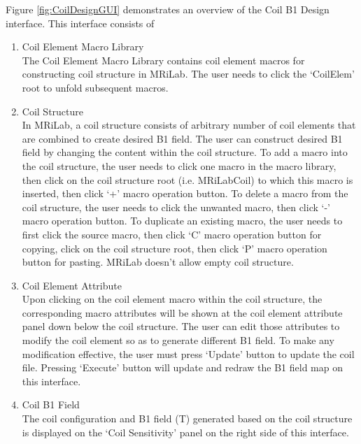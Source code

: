 \documentclass{book}%
\begin{document}
Figure \ref{fig:CoilDesignGUI} demonstrates an overview of the Coil B1 Design interface. This interface consists of 

\begin{enumerate}
	\item Coil Element Macro Library \\
	
The Coil Element Macro Library contains coil element macros for constructing coil structure in MRiLab. The user needs to click the `CoilElem' root to unfold subsequent macros.

	\item Coil Structure \\
	
In MRiLab, a coil structure consists of arbitrary number of coil elements that are combined to create desired B1 field. The user can construct desired B1 field by changing the content within the coil structure. To add a macro into the coil structure, the user needs to click one macro in the macro library, then click on the coil structure root (i.e. MRiLabCoil) to which this macro is inserted, then click `+' macro operation button. To delete a macro from the coil structure, the user needs to click the unwanted macro, then click `-' macro operation button. To duplicate an existing macro, the user needs to first click the source macro, then click `C' macro operation button for copying, click on the coil structure root, then click `P' macro operation button for pasting. MRiLab doesn't allow empty coil structure.
	
	
	\item Coil Element Attribute \\
	
Upon clicking on the coil element macro within the coil structure, the corresponding macro attributes will be shown at the coil element attribute panel down below the coil structure. The user can edit those attributes to modify the coil element so as to generate different B1 field. To make any modification effective, the user must press `Update' button to update the coil file. Pressing `Execute' button will update and redraw the B1 field map on this interface.
	
	\item Coil B1 Field \\

The coil configuration and B1 field (T) generated based on the coil structure is displayed on the `Coil Sensitivity' panel on the right side of this interface.
	

\end{enumerate}
\end{document}

